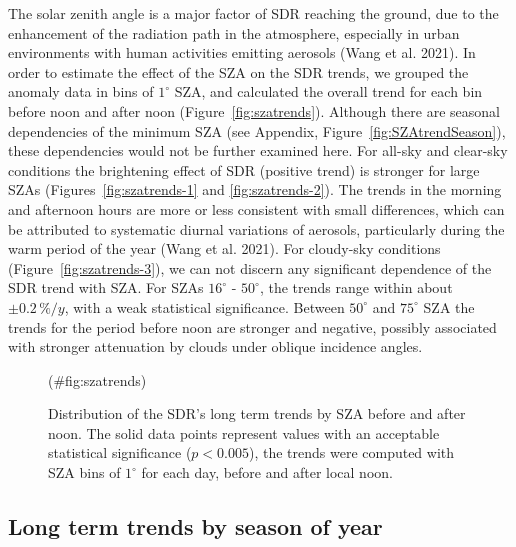 \documentclass[
  preprint, 3p, authoryear]{article}
\begin{document}
The solar zenith angle is a major factor of SDR reaching the ground, due to the enhancement of the radiation path in the atmosphere, especially in urban environments with human activities emitting aerosols (Wang et al. 2021).
In order to estimate the effect of the SZA on the SDR trends, we grouped the anomaly data in bins of \(1^\circ\) SZA, and calculated the overall trend for each bin before noon and after noon (Figure~\ref{fig:szatrends}).
Although there are seasonal dependencies of the minimum SZA (see Appendix, Figure~\ref{fig:SZAtrendSeason}), these dependencies would not be further examined here.
For all-sky and clear-sky conditions the brightening effect of SDR (positive trend) is stronger for large SZAs (Figures~\ref{fig:szatrends-1} and \ref{fig:szatrends-2}).
The trends in the morning and afternoon hours are more or less consistent with small differences, which can be attributed to systematic diurnal variations of aerosols, particularly during the warm period of the year (Wang et al. 2021).
For cloudy-sky conditions (Figure~\ref{fig:szatrends-3}), we can not discern any significant dependence of the SDR trend with SZA.
For SZAs \(16^\circ\) - \(50^\circ\), the trends range within about \(\pm 0.2\,\%/y\), with a weak statistical significance.
Between \(50^\circ\) and \(75^\circ\) SZA the trends for the period before noon are stronger and negative, possibly associated with stronger attenuation by clouds under oblique incidence angles.

\begin{figure}[h!]

{\centering {}

}

\caption{Distribution of the SDR's long term trends by SZA before and after noon. The solid data points represent values with an acceptable statistical significance ($p<0.005$), the trends were computed with SZA bins of $1^\circ$ for each day, before and after local noon.}(\#fig:szatrends)
\end{figure}

\hypertarget{long-term-trends-by-season-of-year}{%
\subsection{Long term trends by season of year}\label{long-term-trends-by-season-of-year}}
\end{document}
